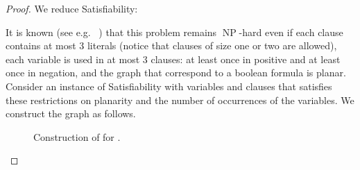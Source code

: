 \documentclass[11pt,a4paper]{article}
\DeclareMathOperator{\operatorClassNP}{NP}
\newcommand{\classNP}{\ensuremath{\operatorClassNP}}
\begin{document}
\begin{proof}
We reduce {\sc Satisfiability}:
\begin{center}
\noindent{}
\end{center}
It is known (see e.g.~
\cite{DahlhausJPSY94}) that this problem remains \classNP-hard even if each clause contains at most 3 literals (notice that clauses of size one or two are allowed), each variable
is used in at most 3 clauses: at least once in positive and at least once in negation, and the graph that correspond to a
boolean formula is planar. Consider an instance of {\sc Satisfiability} with  variables  and  clauses
 that satisfies these restrictions on planarity and the number of occurrences of the variables. We construct the graph 
as follows.


\begin{figure}[ht]
\centering{}
\caption{Construction of  for .
\label{fig:NPh}}
\end{figure}




\end{proof}
\end{document}
